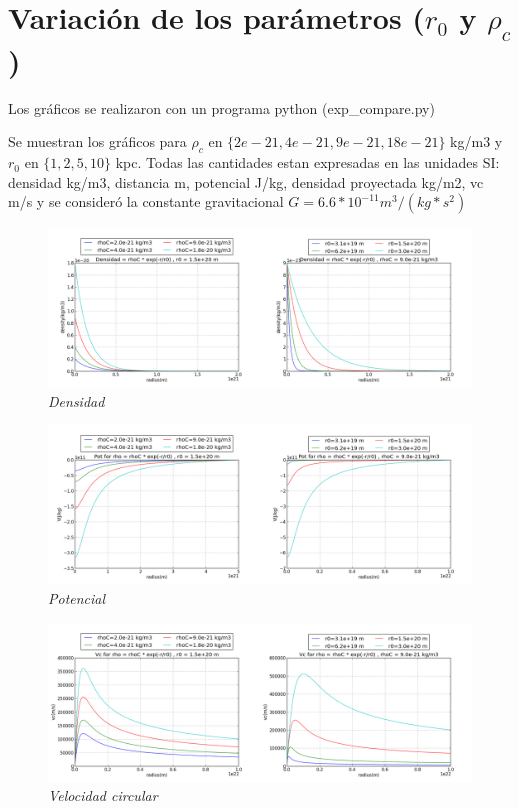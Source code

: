\documentclass[12pt]{book}
\begin{document}
\clearpage

\section*{Variación de los parámetros ($r_0$ y $\rho_c$)}

\begin{description}
\item Los gráficos se realizaron con un programa python (exp\_compare.py) 
\item Se muestran los gráficos  para $\rho_c$ en $ \{2e-21,4e-21,9e-21,18e-21 \}  $ kg/m3 y $r_0$ en $\{1, 2, 5, 10 \} $ kpc. 
Todas las cantidades estan expresadas en las unidades SI: densidad kg/m3, distancia m, potencial J/kg, densidad proyectada kg/m2, vc m/s y se consideró la constante gravitacional $G = 6.6 * 10^{-11} m^3/(kg * s^2)$

\end{description}



\begin{figure}[!ht]
 \centering
 \includegraphics[scale=0.33]{densFinal.png}
 \caption{\emph{Densidad}}
\end{figure}


\begin{figure}[!ht]
 \centering
 \includegraphics[scale=0.33]{potFinal.png}
 \caption{\emph{Potencial}}
\end{figure}


\begin{figure}[!ht]
 \centering
 \includegraphics[scale=0.33]{vcFinal.png}
 \caption{\emph{Velocidad circular}}
\end{figure}
\end{document}
